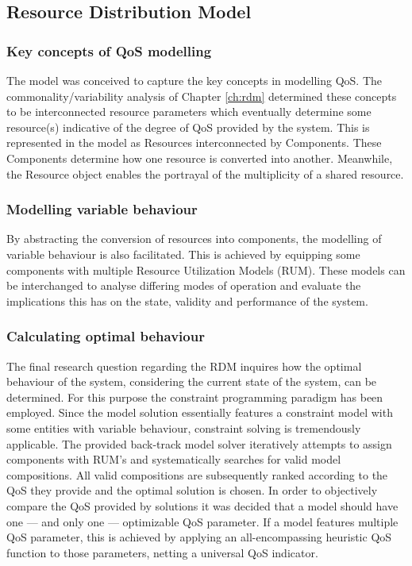 \subsection{Resource Distribution Model}
\subsubsection{Key concepts of QoS modelling}
The model was conceived to capture the key concepts in modelling QoS. The commonality/variability analysis of Chapter \ref{ch:rdm} determined these concepts to be interconnected resource parameters which eventually determine some resource(s) indicative of the degree of QoS provided by the system. This is represented in the model as Resources interconnected by Components. These Components determine how one resource is converted into another. Meanwhile, the Resource object enables the portrayal of the multiplicity of a shared resource.

\subsubsection{Modelling variable behaviour}
By abstracting the conversion of resources into components, the modelling of variable behaviour is also facilitated. This is achieved by equipping some components with multiple Resource Utilization Models (RUM). These models can be interchanged to analyse differing modes of operation and evaluate the implications this has on the state, validity and performance of the system.

\subsubsection{Calculating optimal behaviour}
The final research question regarding the RDM inquires how the optimal behaviour of the system, considering the current state of the system, can be determined. For this purpose the constraint programming paradigm has been employed. Since the model solution essentially features a constraint model with some entities with variable behaviour, constraint solving is tremendously applicable. The provided back-track model solver iteratively attempts to assign components with RUM's and systematically searches for valid model compositions. All valid compositions are subsequently ranked according to the QoS they provide and the optimal solution is chosen. In order to objectively compare the QoS provided by solutions it was decided that a model should have one --- and only one --- optimizable QoS parameter. If a model features multiple QoS parameter, this is achieved by applying an all-encompassing heuristic QoS function to those parameters, netting a universal QoS indicator.


